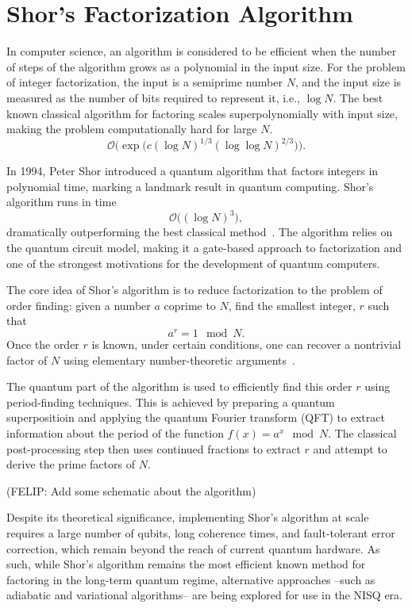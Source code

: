 \section{Shor's Factorization Algorithm}

In computer science, an algorithm is considered to be efficient when the number of steps
of the algorithm grows as a polynomial in the input size. For the problem of integer factorization,
the input is a semiprime number $N$, and the input size is measured as the number of bits
required to represent it, i.e., $\log N$. The best known classical algorithm for factoring
scales superpolynomially with input size, making the problem computationally hard for large $N$.
\begin{equation}
    \mathcal{O} \bigg( \exp \big( c(\log N)^{1/3} (\log \log N)^{2/3} \big) \bigg).
    \label{eq:field_sieve_scaling}
\end{equation}

In 1994, Peter Shor introduced a quantum algorithm that factors integers in polynomial time,
marking a landmark result in quantum computing. Shor's algorithm runs in time
\begin{equation}
    \mathcal{O} \big( (\log N)^3 \big),
    \label{eq:shor_scaling}
\end{equation}
dramatically outperforming the best classical method~\cite{nielsen00}. The algorithm relies on the quantum
circuit model, making it a gate-based approach to factorization and one of the strongest motivations
for the development of quantum computers.

The core idea of Shor's algorithm is to reduce factorization to the problem of order finding:
given a number $a$ coprime to $N$, find the smallest integer, $r$ such that
\begin{equation}
    a^r = 1 \mod N.
    \label{eq:order_finding}
\end{equation}
Once the order $r$ is known, under certain conditions, one can recover a nontrivial factor of
$N$ using elementary number-theoretic arguments~\cite{nielsen00}.

The quantum part of the algorithm is used to efficiently find this order $r$ using
period-finding techniques. This is achieved by preparing a quantum superpositioin and applying the
quantum Fourier transform (QFT) to extract information about the period of the function
$f(x) = a^x \mod N$. The classical post-processing step then uses continued fractions to extract $r$
and attempt to derive the prime factors of $N$.

{\color{red}(FELIP: Add some schematic about the algorithm)}

Despite its theoretical significance, implementing Shor's algorithm at scale requires a
large number of qubits, long coherence times, and fault-tolerant error correction,
which remain beyond the reach of current quantum hardware. As such, while Shor's algorithm remains
the most efficient known method for factoring in the long-term quantum regime, alternative approaches
--such as adiabatic and variational algorithms-- are being explored for use in the NISQ era.